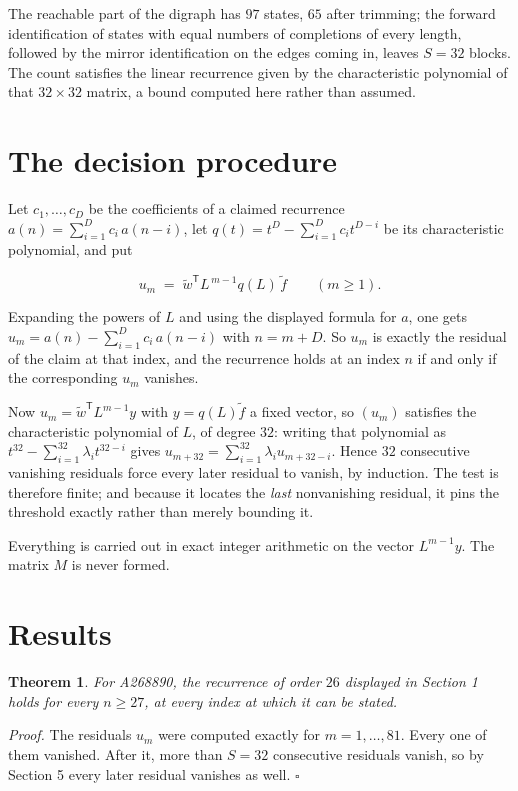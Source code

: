 \documentclass[11pt]{article}
\newtheorem{theorem}{Theorem}
\theoremstyle{definition}
\begin{document}
The reachable part of the digraph has $97$ states, $65$ after trimming; the forward identification of states with equal numbers of completions of every length, followed by the mirror identification on the edges coming in, leaves $S = 32$ blocks. The count satisfies the linear recurrence given by the characteristic polynomial of that $32\times32$ matrix, a bound computed here rather than assumed.

\section{The decision procedure}

Let $c_1,\dots,c_D$ be the coefficients of a claimed recurrence $a(n) = \sum_{i=1}^{D} c_i\,a(n-i)$, let $q(t) = t^{D} - \sum_{i=1}^{D} c_i t^{D-i}$ be its characteristic polynomial, and put

\[u_m \;=\; \tilde w^{\mathsf T} L^{\,m-1} q(L)\,\tilde f \qquad (m \ge 1).\]

Expanding the powers of $L$ and using the displayed formula for $a$, one gets $u_m = a(n) - \sum_{i=1}^{D} c_i\,a(n-i)$ with $n = m + D$. So $u_m$ is exactly the residual of the claim at that index, and the recurrence holds at an index $n$ if and only if the corresponding $u_m$ vanishes.

Now $u_m = \tilde w^{\mathsf T} L^{m-1} y$ with $y = q(L)\tilde f$ a fixed vector, so $(u_m)$ satisfies the characteristic polynomial of $L$, of degree $32$: writing that polynomial as $t^{32} - \sum_{i=1}^{32} \lambda_i t^{32-i}$ gives $u_{m+32} = \sum_{i=1}^{32} \lambda_i u_{m+32-i}$. Hence $32$ consecutive vanishing residuals force every later residual to vanish, by induction. The test is therefore finite; and because it locates the {\itshape last} nonvanishing residual, it pins the threshold exactly rather than merely bounding it.

Everything is carried out in exact integer arithmetic on the vector $L^{m-1}y$. The matrix $M$ is never formed.

\section{Results}

\begin{theorem} For A268890, the recurrence of order $26$ displayed in Section 1 holds for every $n \ge 27$, at every index at which it can be stated.\end{theorem}

{\itshape Proof.} The residuals $u_m$ were computed exactly for $m = 1,\dots,81$. Every one of them vanished. After it, more than $S = 32$ consecutive residuals vanish, so by Section 5 every later residual vanishes as well. $\square$
\end{document}
